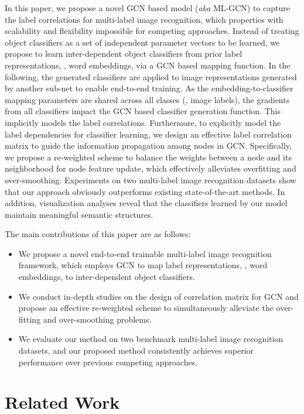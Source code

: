 \documentclass[10pt,twocolumn,letterpaper]{article}
\begin{document}
In this paper, we propose a novel GCN based model (\emph{aka} ML-GCN) to capture the label correlations for multi-label image recognition, which properties with scalability and flexibility impossible for competing approaches. Instead of treating object classifiers as a set of independent parameter vectors to be learned, we propose to learn inter-dependent object classifiers from prior label representations, \eg, word embeddings, via a GCN based mapping function. In the following, the generated classifiers are applied to image representations generated by another sub-net to enable end-to-end training. As the embedding-to-classifier mapping parameters are shared across all classes (\ie, image labels), the gradients from all classifiers impact the GCN based classifier generation function. This implicitly models the label correlations. Furthermore, to explicitly model the label dependencies for classifier learning, we design an effective label correlation matrix to guide the information propagation among nodes in GCN. Specifically, we propose a re-weighted scheme to balance the weights between a node and its neighborhood for node feature update, which effectively alleviates overfitting and over-smoothing. Experiments on two multi-label image recognition datasets show that our approach obviously outperforms existing state-of-the-art methods. In addition, visualization analyses reveal that the classifiers learned by our model maintain meaningful semantic structures.



The main contributions of this paper are as follows:
\vspace{-5pt}
 \begin{itemize}
\setlength{\itemsep}{-2pt}
 	\item We propose a novel end-to-end trainable multi-label image recognition framework, which employs GCN to map label representations, \eg, word embeddings, to inter-dependent object classifiers.
 	\item We conduct in-depth studies on the design of correlation matrix for GCN and propose an effective re-weighted scheme to simultaneously alleviate the over-fitting and over-smoothing problems.
\item We evaluate our method on two benchmark multi-label image recognition datasets, and our proposed method consistently achieves superior performance over previous competing approaches.
 \end{itemize}
 
\section{Related Work}
\end{document}
